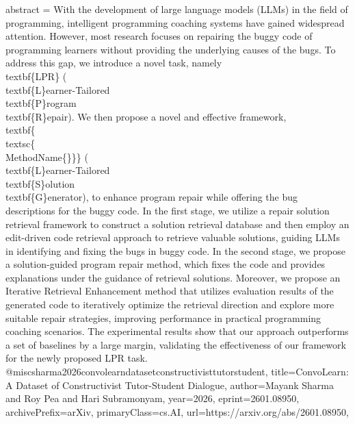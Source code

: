 {      abstract = {With the development of large language models (LLMs) in the field of programming, intelligent programming coaching systems have gained widespread attention. However, most research focuses on repairing the buggy code of programming learners without providing the underlying causes of the bugs. To address this gap, we introduce a novel task, namely \\textbf\{LPR\} (\\textbf\{L\}earner-Tailored \\textbf\{P\}rogram \\textbf\{R\}epair). We then propose a novel and effective framework, \\textbf\{\\textsc\{\\MethodName\{\}\}\} (\\textbf\{L\}earner-Tailored \\textbf\{S\}olution \\textbf\{G\}enerator), to enhance program repair while offering the bug descriptions for the buggy code. In the first stage, we utilize a repair solution retrieval framework to construct a solution retrieval database and then employ an edit-driven code retrieval approach to retrieve valuable solutions, guiding LLMs in identifying and fixing the bugs in buggy code. In the second stage, we propose a solution-guided program repair method, which fixes the code and provides explanations under the guidance of retrieval solutions. Moreover, we propose an Iterative Retrieval Enhancement method that utilizes evaluation results of the generated code to iteratively optimize the retrieval direction and explore more suitable repair strategies, improving performance in practical programming coaching scenarios. The experimental results show that our approach outperforms a set of baselines by a large margin, validating the effectiveness of our framework for the newly proposed LPR task.}
}@misc{sharma2026convolearndatasetconstructivisttutorstudent,
      title={ConvoLearn: A Dataset of Constructivist Tutor-Student Dialogue}, 
      author={Mayank Sharma and Roy Pea and Hari Subramonyam},
      year={2026},
      eprint={2601.08950},
      archivePrefix={arXiv},
      primaryClass={cs.AI},
      url={https://arxiv.org/abs/2601.08950},
}

